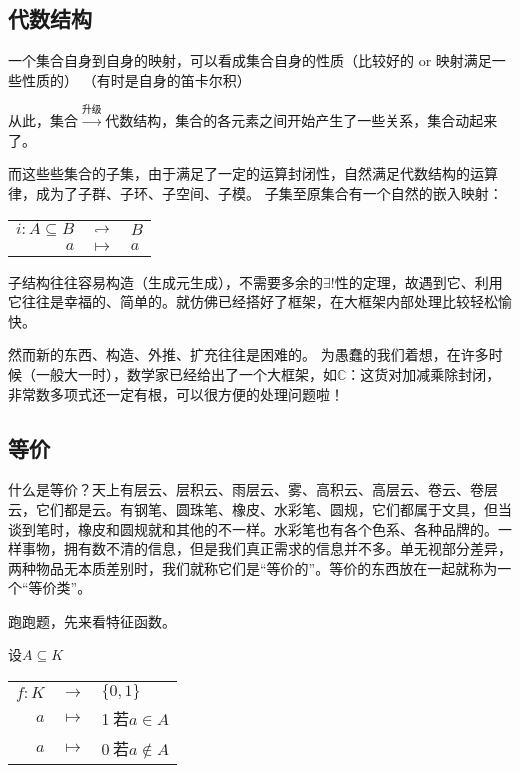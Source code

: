 \documentclass[UTF8]{ctexart}
\begin{document}
\subsection{代数结构}

一个集合自身到自身的映射，可以看成集合自身的性质（比较好的 or 映射满足一些性质的）
（有时是自身的笛卡尔积）

从此，集合$\xrightarrow{\text{升级}}$代数结构，集合的各元素之间开始产生了一些关系，集合动起来了。

而这些些集合的子集，由于满足了一定的运算封闭性，自然满足代数结构的运算律，成为了子群、子环、子空间、子模。
子集至原集合有一个自然的嵌入映射：
\begin{center}
    \begin{tabular}{rcl}
    $i:A \subseteq B$&$\rotatebox[origin=c]{180}{$\hookleftarrow$}$&$B$  \\
    $a$ &$\mapsto$&$a$
    \end{tabular}
\end{center}

子结构往往容易构造（生成元生成），不需要多余的$\exists !$性的定理，故遇到它、利用它往往是幸福的、简单的。就仿佛已经搭好了框架，在大框架内部处理比较轻松愉快。

然而新的东西、构造、外推、扩充往往是困难的。
为愚蠢的我们着想，在许多时候（一般大一时），数学家已经给出了一个大框架，如$\mathbb{C}$：这货对加减乘除封闭，非常数多项式还一定有根，可以很方便的处理问题啦！

\subsection{等价}

什么是等价？天上有层云、层积云、雨层云、雾、高积云、高层云、卷云、卷层云，它们都是云。有钢笔、圆珠笔、橡皮、水彩笔、圆规，它们都属于文具，但当谈到笔时，橡皮和圆规就和其他的不一样。水彩笔也有各个色系、各种品牌的。一样事物，拥有数不清的信息，但是我们真正需求的信息并不多。单无视部分差异，两种物品无本质差别时，我们就称它们是“等价的”。等价的东西放在一起就称为一个“等价类”。

跑跑题，先来看特征函数。

设$A\subseteq K$

\begin{center}
    \begin{tabular}{rcl}
    $f:K$&$\rightarrow$&$\{ 0, 1\}$  \\
    $a$ &$\mapsto$&1$\ $若$a \in A$  \\
    $a$ &$\mapsto$&0$\ $若$a \notin A$
    \end{tabular}
\end{center}
\end{document}

